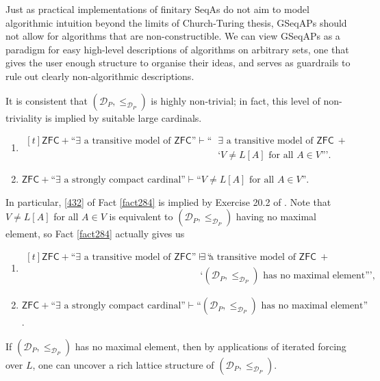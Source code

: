 \documentclass[12pt]{article}
\numberwithin{equation}{section}
\begin{document}
Just as practical implementations of finitary SeqAs do not aim to model algorithmic intuition beyond the limits of Church-Turing thesis, GSeqAPs should not allow for algorithms that are non-constructible. We can view GSeqAPs as a paradigm for easy high-level descriptions of algorithms on arbitrary sets, one that gives the user enough structure to organise their ideas, and serves as guardrails to rule out clearly non-algorithmic descriptions.

It is consistent that $(\mathcal{D}_P, \leq_{\mathcal{D}_P})$ is highly non-trivial; in fact, this level of non-triviality is implied by suitable large cardinals.

\begin{fact}\label{fact284}
\leavevmode
\begin{enumerate}[label=(\arabic*)]
    \item 
    \!
    $\begin{aligned}[t]
        \mathsf{ZFC} + \text{``} \exists \text{ a transitive model of } \mathsf{ZFC} \text{''} \vdash \text{``} & \exists \text{ a transitive model of } \mathsf{ZFC} \ + \\
        & \text{`} V \neq L[A] \text{ for all } A \in V \text{'''.}
    \end{aligned}$
    \item\label{432} $\mathsf{ZFC} + \text{``} \exists \text{ a strongly compact cardinal''} \vdash \text{``} V \neq L[A] \text{ for all } A \in V \text{''}$.
\end{enumerate}
\end{fact}

In particular, \ref{432} of Fact \ref{fact284} is implied by Exercise 20.2 of \cite{jech}. Note that $V \neq L[A]$ for all $A \in V$ is equivalent to $(\mathcal{D}_P, \leq_{\mathcal{D}_P})$ having no maximal element, so Fact \ref{fact284} actually gives us

\begin{enumerate}[label=(E\arabic*)]
    \item\label{e1}
    \!
    $\begin{aligned}[t]
        \mathsf{ZFC} + \text{``} \exists \text{ a transitive model of } \mathsf{ZFC} \text{''} \vdash \text{``} & \exists \text{ a transitive model of } \mathsf{ZFC} \ + \\
        & \text{`} (\mathcal{D}_P, \leq_{\mathcal{D}_P}) \text{ has no maximal element''',}
    \end{aligned}$
    \item $\mathsf{ZFC} + \text{``} \exists \text{ a strongly compact cardinal''} \vdash \text{``} (\mathcal{D}_P, \leq_{\mathcal{D}_P}) \text{ has no maximal element''}$.
\end{enumerate}
If $(\mathcal{D}_P, \leq_{\mathcal{D}_P})$ has no maximal element, then by applications of iterated forcing over $L$, one can uncover a rich lattice structure of $(\mathcal{D}_P, \leq_{\mathcal{D}_P})$.
\end{document}
